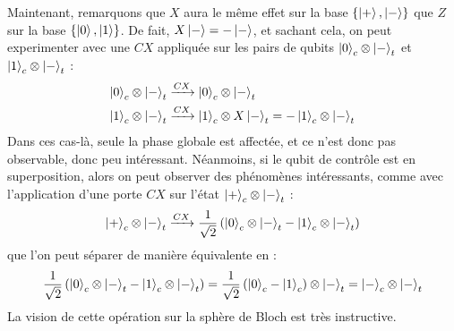 Maintenant, remarquons que $X$ aura le même effet sur la base $\{\ket{+}, \ket{-}\}$ que
$Z$ sur la base $\{\ket{0}, \ket{1}\}$.
De fait, $X \ket{-} = -\ket{-}$, et sachant cela, on peut experimenter avec une $CX$
appliquée sur les pairs de qubits $\ket{0}_c \otimes \ket{-}_t$ et $\ket{1}_c \otimes \ket{-}_t$ :
\begin{align*}
    \ket{0}_c \otimes \ket{-}_t &\xrightarrow{CX} \ket{0}_c \otimes \ket{-}_t \\
    \ket{1}_c \otimes \ket{-}_t &\xrightarrow{CX} \ket{1}_c \otimes X \ket{-}_t = -\ket{1}_c \otimes \ket{-}_t
\end{align*}
Dans ces cas-là, seule la phase globale est affectée, et ce n'est donc pas observable,
donc peu intéressant.
Néanmoins, si le qubit de contrôle est en superposition, alors on peut observer
des phénomènes intéressants, comme avec l'application d'une porte $CX$ sur l'état
$\ket{+}_c \otimes \ket{-}_t$ :
\[
    \ket{+}_c \otimes \ket{-}_t \xrightarrow{CX} \frac{1}{\sqrt{2}} \left( \ket{0}_c \otimes \ket{-}_t - \ket{1}_c \otimes \ket{-}_t \right)
\]
que l'on peut séparer de manière équivalente en :
\[
    \frac{1}{\sqrt{2}} \left( \ket{0}_c \otimes \ket{-}_t - \ket{1}_c \otimes \ket{-}_t \right) = \frac{1}{\sqrt{2}} \left( \ket{0}_c - \ket{1}_c \right) \otimes \ket{-}_t = \ket{-}_c \otimes \ket{-}_t
\]
La vision de cette opération sur la sphère de Bloch est très instructive.

